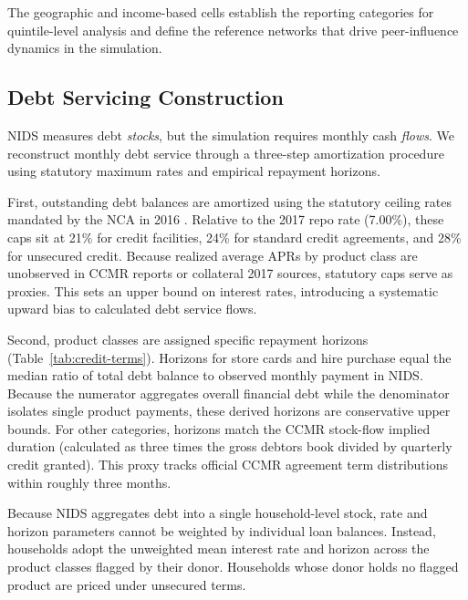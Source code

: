 The geographic and income-based cells establish the reporting categories for quintile-level analysis and define the reference networks that drive peer-influence dynamics in the simulation.

\subsection{Debt Servicing Construction}
\label{sec:servicing}

\ac{NIDS} measures debt \emph{stocks}, but the simulation requires monthly cash \emph{flows}.
We reconstruct monthly debt service through a three-step amortization procedure using statutory maximum rates and empirical repayment horizons.

First, outstanding debt balances are amortized using the statutory ceiling rates mandated by the \ac{NCA} in 2016 \cite{sa_ncr_ratecaps_2016}.
Relative to the 2017 repo rate (7.00\%), these caps sit at 21\% for credit facilities, 24\% for standard credit agreements, and 28\% for unsecured credit.
Because realized average \acp{APR} by product class are unobserved in \ac{CCMR} reports \cite{ncr_ccmr_2017} or collateral 2017 sources, statutory caps serve as proxies.
This sets an upper bound on interest rates, introducing a systematic upward bias to calculated debt service flows.

Second, product classes are assigned specific repayment horizons (Table~\ref{tab:credit-terms}). Horizons for store cards and hire purchase equal the median ratio of total debt balance to observed monthly payment in \ac{NIDS}.
Because the numerator aggregates overall financial debt while the denominator isolates single product payments, these derived horizons are conservative upper bounds.
For other categories, horizons match the \ac{CCMR} stock-flow implied duration (calculated as three times the gross debtors book divided by quarterly credit granted).
This proxy tracks official \ac{CCMR} agreement term distributions within roughly three months.

Because \ac{NIDS} aggregates debt into a single household-level stock, rate and horizon parameters cannot be weighted by individual loan balances.
Instead, households adopt the unweighted mean interest rate and horizon across the product classes flagged by their donor.
Households whose donor holds no flagged product are priced under unsecured terms.

